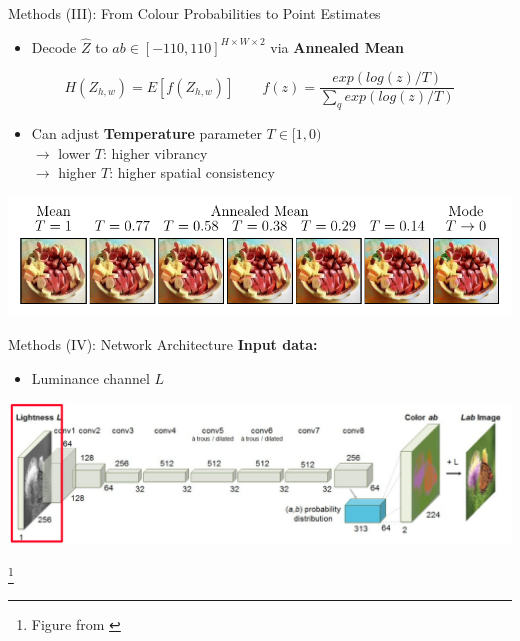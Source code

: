 \documentclass{beamer}
\newcommand\blfootnote[1]{%
  \begingroup
  \renewcommand\thefootnote{}\footnote{#1}%
  \addtocounter{footnote}{-1}%
  \endgroup
}
\begin{document}
\begin{frame}{Methods (III): From Colour Probabilities to Point Estimates}
  \begin{itemize}
    \item Decode $\hat{Z}$ to $ab \in [-110,110]^{H \times W \times 2}$ via \textbf{Annealed Mean}
  \end{itemize}

  \begin{equation}
    H(Z_{h,w}) = E[f(Z_{h,w})] \qquad f(z) = \frac{exp(log(z)/T)}{\sum_q exp(log(z)/T)}
  \end{equation}

  \begin{itemize}
    \item Can adjust \textbf{Temperature} parameter $T \in [1, 0)$ \\
          $\rightarrow$ lower $T$: higher vibrancy \\
          $\rightarrow$ higher $T$: higher spatial consistency
  \end{itemize}

  \medskip

  \includegraphics[width=\linewidth]{resources/annealed_mean.pdf}
\end{frame}

\begin{frame}{Methods (IV): Network Architecture}
  \textbf{Input data:}
    \begin{itemize}
       \item Luminance channel $L$
    \end{itemize}

  \medskip

  \includegraphics[width=\linewidth]{resources/network1.jpg}

  \blfootnote{Figure from \cite{Zhang2016}}
\end{frame}
\end{document}
